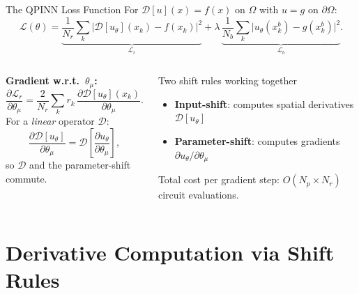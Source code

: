 \documentclass[aspectratio=169,11pt]{beamer}
\begin{document}
\begin{frame}{The QPINN Loss Function}
  For $\mathcal{D}[u](x) = f(x)$ on $\Omega$ with
  $u=g$ on $\partial\Omega$:
  \[
    \mathcal{L}(\theta)
    = \underbrace{\frac{1}{N_r}\sum_k
        \bigl|\mathcal{D}[u_\theta](x_k) - f(x_k)\bigr|^2}_{
        \mathcal{L}_r}
      + \lambda\,\underbrace{\frac{1}{N_b}\sum_k
        \bigl|u_\theta(x_k^b) - g(x_k^b)\bigr|^2}_{
        \mathcal{L}_b}.
  \]

  \begin{columns}[T]
    \textbf{Gradient w.r.t.\ $\theta_\mu$:}
    \[
      \frac{\partial\mathcal{L}_r}{\partial\theta_\mu}
      = \frac{2}{N_r}\sum_k r_k\,
        \frac{\partial\mathcal{D}[u_\theta](x_k)}
             {\partial\theta_\mu}.
    \]
    For a \emph{linear} operator $\mathcal{D}$:
    \[
      \frac{\partial\mathcal{D}[u_\theta]}{\partial\theta_\mu}
      = \mathcal{D}\!\left[
          \frac{\partial u_\theta}{\partial\theta_\mu}
        \right],
    \]
    so $\mathcal{D}$ and the parameter-shift commute.
    \begin{alertblock}{Two shift rules working together}
      \begin{itemize}
        \item \textbf{Input-shift}: computes spatial
              derivatives $\mathcal{D}[u_\theta]$
        \item \textbf{Parameter-shift}: computes gradients
              $\partial u_\theta/\partial\theta_\mu$
      \end{itemize}
      Total cost per gradient step:
      $O(N_p \times N_r)$ circuit evaluations.
    \end{alertblock}
  \end{columns}
\end{frame}

\section{Derivative Computation via Shift Rules}
\end{document}

